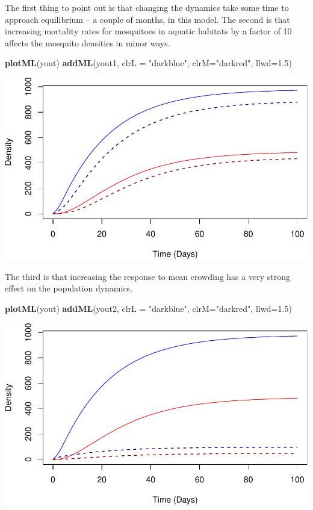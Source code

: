 \documentclass[
]{book}
\newenvironment{Shaded}{\begin{snugshade}}{\end{snugshade}}
\newcommand{\AttributeTok}[1]{\textcolor[rgb]{0.13,0.29,0.53}{#1}}
\newcommand{\FloatTok}[1]{\textcolor[rgb]{0.00,0.00,0.81}{#1}}
\newcommand{\FunctionTok}[1]{\textcolor[rgb]{0.13,0.29,0.53}{\textbf{#1}}}
\newcommand{\NormalTok}[1]{#1}
\newcommand{\StringTok}[1]{\textcolor[rgb]{0.31,0.60,0.02}{#1}}
\begin{document}
The first thing to point out is that changing the dynamics take some time to approach equilibrium -- a couple of months, in this model. The second is that increasing mortality rates for mosquitoes in aquatic habitats by a factor of 10 affects the mosquito densities in minor ways.

\begin{Shaded}
\begin{Highlighting}[]
\FunctionTok{plotML}\NormalTok{(yout)}
\FunctionTok{addML}\NormalTok{(yout1, }\AttributeTok{clrL =} \StringTok{"darkblue"}\NormalTok{, }\AttributeTok{clrM=}\StringTok{"darkred"}\NormalTok{, }\AttributeTok{llwd=}\FloatTok{1.5}\NormalTok{)}
\end{Highlighting}
\end{Shaded}

\includegraphics{_main_files/figure-latex/unnamed-chunk-25-1.pdf}

The third is that increasing the response to mean crowding has a very strong effect on the population dynamics.

\begin{Shaded}
\begin{Highlighting}[]
\FunctionTok{plotML}\NormalTok{(yout)}
\FunctionTok{addML}\NormalTok{(yout2, }\AttributeTok{clrL =} \StringTok{"darkblue"}\NormalTok{, }\AttributeTok{clrM=}\StringTok{"darkred"}\NormalTok{, }\AttributeTok{llwd=}\FloatTok{1.5}\NormalTok{)}
\end{Highlighting}
\end{Shaded}

\includegraphics{_main_files/figure-latex/unnamed-chunk-26-1.pdf}
\end{document}
